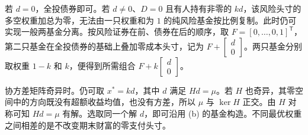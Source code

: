 \begin{solution}[blank-type=manual,blank-vsep=9\baselineskip]
\begin{enumerate}[label=(\alph*)]
 若 $d=0$，全投债券即可。若 $d\ne0$、$D=0$ 且有人持有非零的 $kd$，该风险头寸的多空权重加总为零，无法由一只权重和为 $1$ 的纯风险基金按比例复制。此时仍可实现一般两基金分离。按风险证券在前、债券在后的顺序，取 $F=[0,\ldots,0,1]^{\mathsf T}$，第二只基金在全投债券的基础上叠加零成本头寸，记为 $F+\begin{bmatrix}d\\0\end{bmatrix}$。两只基金分别取权重 $1-k$ 和 $k$，便得到所需组合 $F+k\begin{bmatrix}d\\0\end{bmatrix}$。
\end{enumerate}

协方差矩阵奇异时。仍可取 $x^*=kd$，其中 $d$ 满足 $Hd=\mu$。若 $H$ 也奇异，其零空间中的方向既没有超额收益均值，也没有方差，所以 $\mu$ 与 $\ker H$ 正交。由 $H$ 对称可知 $Hd=\mu$ 有解。选取同一个解 $d$，即可沿用 (b) 的基金构造。不同最优权重之间相差的是不改变期末财富的零支付头寸。
\end{solution}

